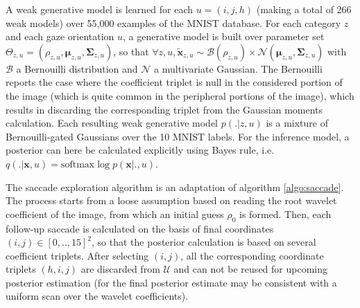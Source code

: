 \documentclass{article} %
\begin{document}
A weak generative model is learned for each $u = (i,j,h)$ (making a total of 266 weak models) over 55,000 examples of the MNIST database. For each category $z$ and each gaze orientation $u$, a generative model is built over parameter set $\Theta_{z,u} = (\rho_{z,u}, \boldsymbol{\mu}_{z,u}, \boldsymbol{\Sigma}_{z,u})$, so that $\forall z,u, \tilde{\boldsymbol{x}}_{z,u} \sim \mathcal{B}(\rho_{z,u}) \times \mathcal{N}(\boldsymbol{\mu}_{z,u}, \boldsymbol{\Sigma}_{z,u})$ with $\mathcal{B}$ a Bernouilli distribution and $\mathcal{N}$ a multivariate Gaussian. The Bernouilli reports the case where the coefficient triplet is null in the considered portion of the image (which is quite common in the peripheral portions of the image), which results in discarding the corresponding triplet from the Gaussian moments calculation. Each resulting weak generative model $p(.|z,u)$ is a mixture of Bernouilli-gated Gaussians over the 10 MNIST labels. For the inference model, a posterior can here be calculated explicitly using Bayes rule, i.e. $q(.|\boldsymbol{x},u) = \text{softmax} \log p(\boldsymbol{x}|.,u)$.

The saccade exploration algorithm is an adaptation of algorithm \ref{algo:saccade}. The process starts from a loose assumption based on reading the root wavelet coefficient of the image, from which an initial guess $\rho_0$ is formed. Then, each follow-up saccade is calculated on the basis of final coordinates $(i,j) \in [0,..,15]^2$, so that the posterior calculation is based on several coefficient triplets. After selecting $(i,j)$, all the corresponding coordinate triplets $(h,i,j)$ are discarded from $\mathcal{U}$ and can not be reused for upcoming posterior estimation (for the final posterior estimate may be consistent with a uniform scan over the wavelet coefficients). 
\end{document}
